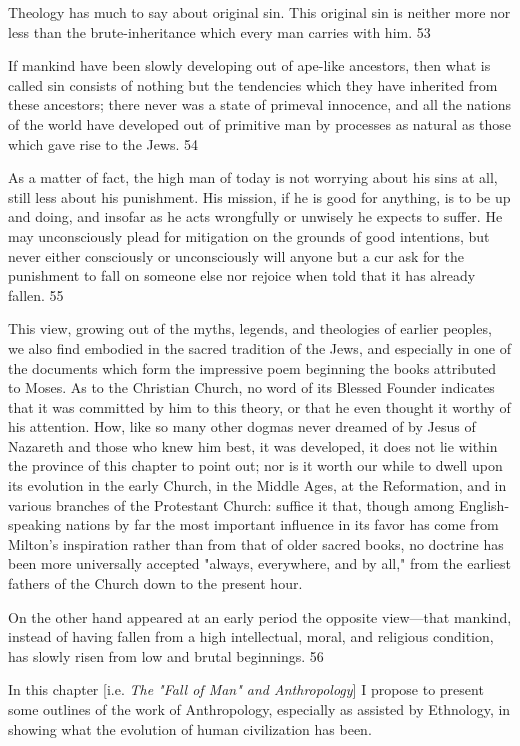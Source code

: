 Theology has much to say about original sin. This original sin is neither more nor less than
the brute-inheritance which every man carries with him. 53

If mankind have been slowly developing out of ape-like ancestors, then what is called sin
consists of nothing but the tendencies which they have inherited from these ancestors; there
never was a state of primeval innocence, and all the nations of the world have developed out
of primitive man by processes as natural as those which gave rise to the Jews. 54

As a matter of fact, the high man of today is not worrying about his sins at all, still less about
his punishment. His mission, if he is good for anything, is to be up and doing, and insofar as
he acts wrongfully or unwisely he expects to suffer. He may unconsciously plead for
mitigation on the grounds of good intentions, but never either consciously or unconsciously
will anyone but a cur ask for the punishment to fall on someone else nor rejoice when told
that it has already fallen. 55

This view, growing out of the myths, legends, and theologies of earlier peoples, we also find
embodied in the sacred tradition of the Jews, and especially in one of the documents which
form the impressive poem beginning the books attributed to Moses. As to the Christian
Church, no word of its Blessed Founder indicates that it was committed by him to this theory,
or that he even thought it worthy of his attention. How, like so many other dogmas never
dreamed of by Jesus of Nazareth and those who knew him best, it was developed, it does not
lie within the province of this chapter to point out; nor is it worth our while to dwell upon its
evolution in the early Church, in the Middle Ages, at the Reformation, and in various
branches of the Protestant Church: suffice it that, though among English-speaking nations by
far the most important influence in its favor has come from Milton's inspiration rather than
from that of older sacred books, no doctrine has been more universally accepted "always,
everywhere, and by all," from the earliest fathers of the Church down to the present hour.

On the other hand appeared at an early period the opposite view—that mankind, instead of
having fallen from a high intellectual, moral, and religious condition, has slowly risen from
low and brutal beginnings. 56

In this chapter [i.e. \textit{The "Fall of Man" and Anthropology}] I propose to present some outlines
of the work of Anthropology, especially as assisted by Ethnology, in showing what the
evolution of human civilization has been.

